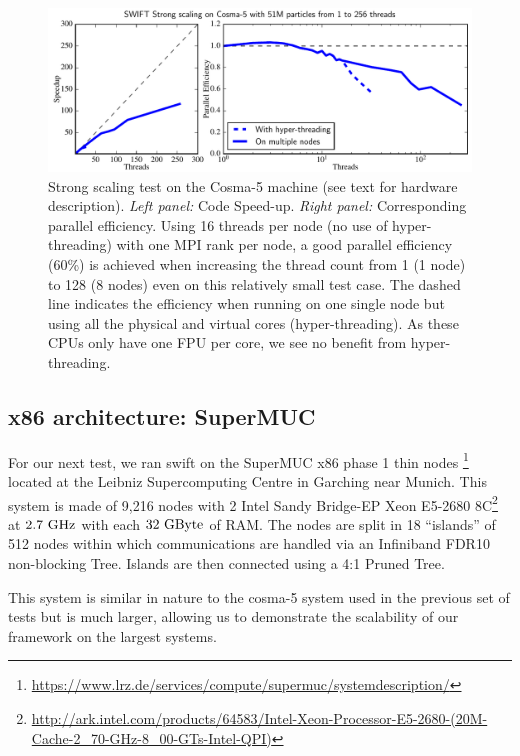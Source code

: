 \documentclass{sig-alternate-05-2015}
\newcommand{\swift}{{\sc swift}\xspace}
\begin{document}
\begin{figure}
\centering
\includegraphics[width=\textwidth]{Figures/scalingCosma}
\caption{Strong scaling test on the Cosma-5 machine (see text for hardware
  description). \textit{Left panel:} Code Speed-up. \textit{Right panel:}
  Corresponding parallel efficiency.  Using 16 threads per node (no use of
  hyper-threading) with one MPI rank per node, a good parallel efficiency (60\%)
  is achieved when increasing the thread count from 1 (1 node) to 128 (8 nodes)
  even on this relatively small test case. The dashed line indicates the
  efficiency when running on one single node but using all the physical and
  virtual cores (hyper-threading). As these CPUs only have one FPU per core, we
  see no benefit from hyper-threading.
  \label{fig:cosma}}
\end{figure}



\subsection{x86 architecture: SuperMUC}

For our next test, we ran \swift on the SuperMUC x86 phase 1 thin
nodes \footnote{\url{https://www.lrz.de/services/compute/supermuc/systemdescription/}}
located at the Leibniz Supercomputing Centre in Garching near Munich. This
system is made of 9,216 nodes with 2 Intel Sandy Bridge-EP Xeon E5-2680
8C\footnote{\url{http://ark.intel.com/products/64583/Intel-Xeon-Processor-E5-2680-(20M-Cache-2_70-GHz-8_00-GTs-Intel-QPI)}}
at $2.7~\rm{GHz}$ with each $32~\rm{GByte}$ of RAM. The nodes are split in 18
``islands'' of 512 nodes within which communications are handled via an
Infiniband FDR10 non-blocking Tree. Islands are then connected using a 4:1
Pruned Tree.

This system is similar in nature to the cosma-5 system used in the previous set
of tests but is much larger, allowing us to demonstrate the scalability of our
framework on the largest systems.
\end{document}
